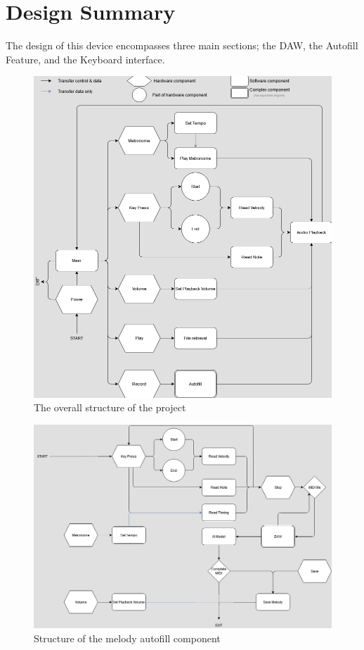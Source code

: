 \section{Design Summary}

The design of this device encompasses three main sections; the DAW, the Autofill Feature,
and the Keyboard interface. 

\begin{figure}[h!]
  \centering
  \includegraphics[width=\linewidth]{image/Keyboard.png}
  \caption{The overall structure of the project}
  \label{fig:keyboard_diagram}
\end{figure}
\begin{figure}[h!]
  \centering
  \includegraphics[width=\linewidth]{image/Autofill.png}
  \caption{Structure of the melody autofill component}
  \label{fig:autofill_diagram}
\end{figure}
